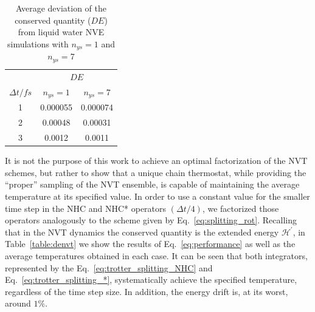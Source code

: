 \documentclass[aip,jcp,reprint,amsmath,amssymb,amsfont]{revtex4-1}
\begin{document}
\begin{table}[h]
\setlength{\tabcolsep}{7pt}
\caption{Average deviation of the conserved quantity ($DE$) from liquid water NVE simulations with $n_{ys}=1$ and $n_{ys}=7$  }
\centering %
\begin{tabular}{| c  c  c |}  
\hline
&  \multicolumn{2}{c|}{ $D E$ }\\
\cline{2-3}
$\Delta t/fs$ &$n_{ys}=1$ &$n_{ys}=7$ \\
\hline %
 1 & 0.000055 & 0.000074\\
 2 & 0.00048 & 0.00031 \\
 3 & 0.0012 & 0.0011\\
 \hline
\end{tabular}
\label{table:nve}
\end{table}

It is not the purpose of this work to achieve an optimal factorization of the NVT schemes, but rather to show that a unique chain thermostat, while providing the ``proper'' sampling of the NVT ensemble, is capable of maintaining the average temperature at its specified value. In order to use a constant value for the smaller time step in the NHC and NHC* operators $(\Delta t/4)$, we factorized those operators analogously to the scheme given by Eq.~\ref{eq:splitting_rot}. Recalling that in the NVT dynamics the conserved quantity is the extended energy $\mathcal{H}^\prime$, in Table~\ref{table:denvt} we show the results of Eq.~\ref{eq:performance} as well as the average temperatures obtained in each case. It can be seen that both integrators, represented by the Eq.~\ref{eq:trotter_splitting_NHC} and Eq.~\ref{eq:trotter_splitting_*}, systematically achieve the specified temperature, regardless of the time step size. In addition, the energy drift is, at its worst, around $1 \%$.
\end{document}
